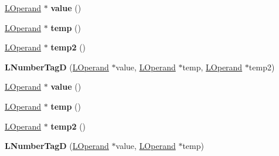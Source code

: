 \begin{DoxyCompactItemize}
\item 
\hyperlink{classv8_1_1internal_1_1_l_operand}{L\+Operand} $\ast$ {\bfseries value} ()\hypertarget{classv8_1_1internal_1_1_l_number_tag_d_a46629ef102a26f699165889f0cc36f88}{}\label{classv8_1_1internal_1_1_l_number_tag_d_a46629ef102a26f699165889f0cc36f88}

\item 
\hyperlink{classv8_1_1internal_1_1_l_operand}{L\+Operand} $\ast$ {\bfseries temp} ()\hypertarget{classv8_1_1internal_1_1_l_number_tag_d_a2163f8b3c4bd0dbeb6700e6dc18aef2c}{}\label{classv8_1_1internal_1_1_l_number_tag_d_a2163f8b3c4bd0dbeb6700e6dc18aef2c}

\item 
\hyperlink{classv8_1_1internal_1_1_l_operand}{L\+Operand} $\ast$ {\bfseries temp2} ()\hypertarget{classv8_1_1internal_1_1_l_number_tag_d_a775756f64a64d70118275571bcd4469d}{}\label{classv8_1_1internal_1_1_l_number_tag_d_a775756f64a64d70118275571bcd4469d}

\item 
{\bfseries L\+Number\+TagD} (\hyperlink{classv8_1_1internal_1_1_l_operand}{L\+Operand} $\ast$value, \hyperlink{classv8_1_1internal_1_1_l_operand}{L\+Operand} $\ast$temp, \hyperlink{classv8_1_1internal_1_1_l_operand}{L\+Operand} $\ast$temp2)\hypertarget{classv8_1_1internal_1_1_l_number_tag_d_a67088b9bb50a700478235225d9d444e8}{}\label{classv8_1_1internal_1_1_l_number_tag_d_a67088b9bb50a700478235225d9d444e8}

\item 
\hyperlink{classv8_1_1internal_1_1_l_operand}{L\+Operand} $\ast$ {\bfseries value} ()\hypertarget{classv8_1_1internal_1_1_l_number_tag_d_a46629ef102a26f699165889f0cc36f88}{}\label{classv8_1_1internal_1_1_l_number_tag_d_a46629ef102a26f699165889f0cc36f88}

\item 
\hyperlink{classv8_1_1internal_1_1_l_operand}{L\+Operand} $\ast$ {\bfseries temp} ()\hypertarget{classv8_1_1internal_1_1_l_number_tag_d_a2163f8b3c4bd0dbeb6700e6dc18aef2c}{}\label{classv8_1_1internal_1_1_l_number_tag_d_a2163f8b3c4bd0dbeb6700e6dc18aef2c}

\item 
\hyperlink{classv8_1_1internal_1_1_l_operand}{L\+Operand} $\ast$ {\bfseries temp2} ()\hypertarget{classv8_1_1internal_1_1_l_number_tag_d_a775756f64a64d70118275571bcd4469d}{}\label{classv8_1_1internal_1_1_l_number_tag_d_a775756f64a64d70118275571bcd4469d}

\item 
{\bfseries L\+Number\+TagD} (\hyperlink{classv8_1_1internal_1_1_l_operand}{L\+Operand} $\ast$value, \hyperlink{classv8_1_1internal_1_1_l_operand}{L\+Operand} $\ast$temp)\hypertarget{classv8_1_1internal_1_1_l_number_tag_d_a8bd293a2f4e86cd47dc87c4514bafae6}{}\label{classv8_1_1internal_1_1_l_number_tag_d_a8bd293a2f4e86cd47dc87c4514bafae6}


\end{DoxyCompactItemize}
